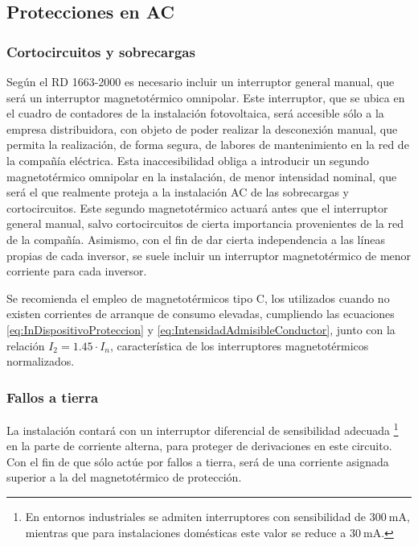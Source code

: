 \subsection{Protecciones en AC}


\subsubsection{Cortocircuitos y sobrecargas}

Según el RD 1663-2000 \cite{RealDecreto2000} es necesario incluir
un interruptor general manual, que será un interruptor magnetotérmico
omnipolar. Este interruptor, que se ubica en el cuadro de contadores
de la instalación fotovoltaica, será accesible sólo a la empresa distribuidora,
con objeto de poder realizar la desconexión manual, que permita la
realización, de forma segura, de labores de mantenimiento en la red
de la compañía eléctrica. Esta inaccesibilidad obliga a introducir
un segundo magnetotérmico omnipolar en la instalación, de menor intensidad
nominal, que será el que realmente proteja a la instalación AC de
las sobrecargas y cortocircuitos. Este segundo magnetotérmico actuará
antes que el interruptor general manual, salvo cortocircuitos de cierta
importancia provenientes de la red de la compañía. Asimismo, con el
fin de dar cierta independencia a las líneas propias de cada inversor,
se suele incluir un interruptor magnetotérmico de menor corriente
para cada inversor.

Se recomienda el empleo de magnetotérmicos tipo C, los utilizados
cuando no existen corrientes de arranque de consumo elevadas, cumpliendo
las ecuaciones \ref{eq:InDispositivoProteccion} y \ref{eq:IntensidadAdmisibleConductor},
junto con la relación $I_{2}=1.45\cdot I_{n}$, característica de
los interruptores magnetotérmicos normalizados.


\subsubsection{Fallos a tierra }

La instalación contará con un interruptor diferencial de sensibilidad
adecuada%
\footnote{En entornos industriales se admiten interruptores con sensibilidad
de $\SI{300}{\milli\ampere}$, mientras que para instalaciones domésticas
este valor se reduce a $\SI{30}{\milli\ampere}$.%
} en la parte de corriente alterna, para proteger de derivaciones en
este circuito. Con el fin de que sólo actúe por fallos a tierra, será
de una corriente asignada superior a la del magnetotérmico de protección. 

